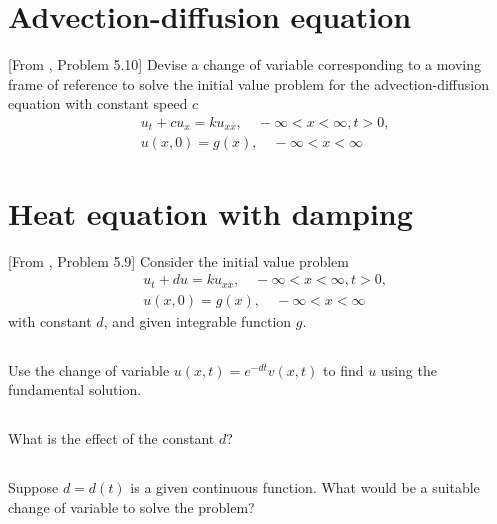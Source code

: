 \documentclass[11pt,letterpaper]{article}
\begin{document}
\section{Advection-diffusion equation}
[From \cite{ShearerLevy_15}, Problem 5.10] Devise a change of variable corresponding to a moving frame of reference to solve the initial value problem for the advection-diffusion equation with constant speed $c$
\begin{align}
    &u_t+cu_x = ku_{xx},\quad -\infty<x<\infty, t>0,\\
    &u(x,0) = g(x),\quad -\infty<x<\infty
\end{align}

\section{Heat equation with damping}
[From \cite{ShearerLevy_15}, Problem 5.9] Consider the initial value problem
\begin{align}
    &u_t+du = ku_{xx},\quad -\infty<x<\infty, t>0,\\
    &u(x,0) = g(x),\quad -\infty<x<\infty
\end{align}
with constant $d$, and given integrable function $g$.

\subsection{}
Use the change of variable $u(x, t) = e^{-dt}v(x,t)$ to find $u$ using the
fundamental solution.

\subsection{}
What is the effect of the constant $d$?

\subsection{}
Suppose $d = d(t)$ is a given continuous function. What would be a suitable
change of variable to solve the problem?


\vfill
\printbibliography
\end{document}
